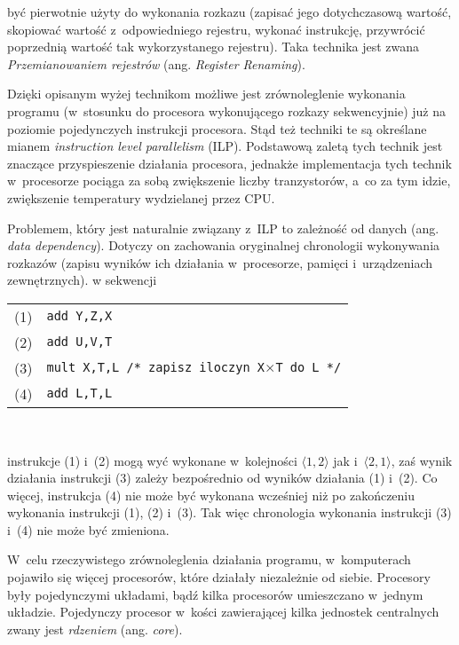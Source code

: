 \documentclass{mwart}
\begin{document}
	być pierwotnie użyty do wykonania rozkazu (zapisać jego dotychczasową wartość, skopiować wartość z~odpowiedniego rejestru, wykonać instrukcję,
	przywrócić poprzednią wartość tak wykorzystanego rejestru). Taka technika jest zwana 
	\emph{Przemianowaniem rejestrów} (ang. \emph{Register Renaming}).
\par
%
\indent
	Dzięki opisanym wyżej technikom możliwe jest zrównoleglenie wykonania programu (w~stosunku do procesora wykonującego rozkazy sekwencyjnie)
	już na poziomie pojedynczych instrukcji procesora. Stąd też techniki te są określane mianem \emph{instruction level parallelism} (ILP).
	Podstawową zaletą tych technik jest znaczące przyspieszenie działania procesora, jednakże implementacja tych technik w~procesorze pociąga za
	sobą zwiększenie liczby tranzystorów, a~co za tym idzie, zwiększenie temperatury wydzielanej przez CPU.
\par
%
\indent
	Problemem, który jest naturalnie związany z~ILP to zależność od danych (ang. \emph{data dependency}).
	Dotyczy on zachowania oryginalnej chronologii wykonywania rozkazów (zapisu wyników
	ich działania w~procesorze, pamięci i~urządzeniach zewnętrznych). w sekwencji
	\begin{flushleft}
	\begin{tabular}{l l}\\
		(1) & {\tt add Y,Z,X} \\
		(2) & {\tt add U,V,T} \\
		(3) & {\tt mult X,T,L /* zapisz iloczyn X}$\times${\tt T do L */} \\
		(4) & {\tt add L,T,L} \\
	\end{tabular}\\
	\end{flushleft}
	instrukcje (1) i~(2) mogą wyć wykonane w~kolejności $\langle 1,2 \rangle$ jak i~$\langle 2,1 \rangle$, zaś wynik działania instrukcji
	(3) zależy bezpośrednio od wyników działania (1) i~(2). Co więcej, instrukcja (4) nie może być wykonana wcześniej 
	niż po zakończeniu wykonania instrukcji (1), (2) i~(3). Tak więc chronologia wykonania instrukcji (3) i~(4) nie może być zmieniona.
\par
%
\indent
	W~celu rzeczywistego zrównoleglenia działania programu, w~komputerach pojawiło się więcej procesorów,
	które działały niezależnie od siebie. Procesory były pojedynczymi układami, bądź kilka procesorów umieszczano w~jednym układzie. 
	Pojedynczy procesor w~kości zawierającej kilka jednostek centralnych zwany jest \emph{rdzeniem} (ang. \emph{core}).
\end{document}

